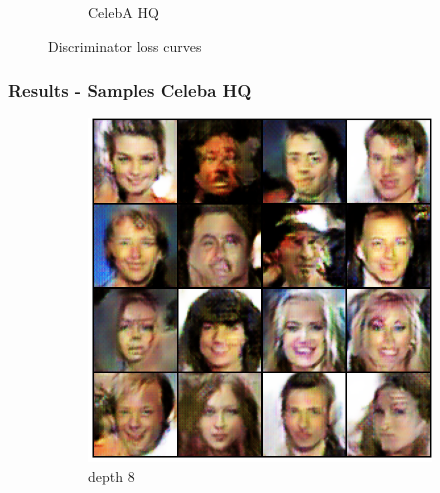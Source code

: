 \begin{frame}
\begin{center}
\begin{figure}[H]
\begin{subfigure}[b]{0.45\textwidth}
                \caption{CelebA HQ}
                \label{fig:anime_face_d_loss}
            \end{subfigure}
            \caption{Discriminator loss curves}
            \label{fig:d_loss}
        \end{figure}
                
    \end{center}
\end{frame}

\begin{frame}
    \frametitle{Results - Samples Celeba HQ}

    \begin{center}
    
        \begin{figure}[H]
            \centering
            \begin{subfigure}[b]{0.24\textwidth}
                \centering
                \includegraphics[width=\textwidth]{resources/images/output_celeba_8.eps}
                \caption{depth 8}
                \label{fig:celeba_8}
            \end{subfigure}
            \hfill
            \begin{subfigure}[b]{0.24\textwidth}
                \centering

\end{subfigure}
\end{figure}
\end{center}
\end{frame}
